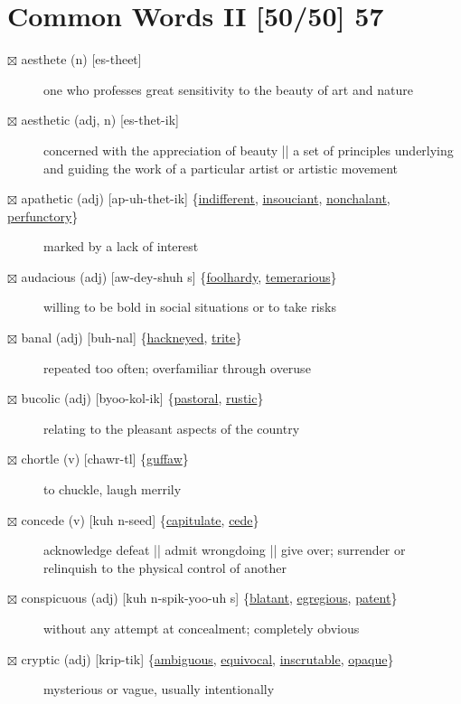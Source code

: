 \documentclass[11pt]{article}
\begin{document}
\section{Common Words II [50/50] 57}
\label{sec:org839aaba}
\begin{description}
\item[{$\boxtimes$ aesthete (n) [es-theet]}] one who professes great sensitivity to the beauty of art and nature
\item[{$\boxtimes$ aesthetic (adj, n) [es-thet-ik]}] concerned with the appreciation of beauty || a set of principles underlying and guiding the work of a particular artist or artistic movement
\item[{$\boxtimes$ \label{org934ecd1}apathetic (adj) [ap-uh-thet-ik] \{\hyperref[org1f21a65]{indifferent}, \hyperref[org2634905]{insouciant}, \hyperref[orge75040c]{nonchalant}, \hyperref[org8561795]{perfunctory}\}}] marked by a lack of interest
\item[{$\boxtimes$ \label{org075f98a}audacious (adj) [aw-dey-shuh s] \{\hyperref[org6f4610e]{foolhardy}, \hyperref[orgd7c2d20]{temerarious}\}}] willing to be bold in social situations or to take risks
\item[{$\boxtimes$ \label{orgf0ea999}banal (adj) [buh-nal] \{\hyperref[org3731f44]{hackneyed}, \hyperref[org91e02d4]{trite}\}}] repeated too often; overfamiliar through overuse
\item[{$\boxtimes$ \label{org534bd51}bucolic (adj) [byoo-kol-ik] \{\hyperref[orge85ac7b]{pastoral}, \hyperref[org9afee9b]{rustic}\}}] relating to the pleasant aspects of the country
\item[{$\boxtimes$ \label{org4d7ee4d}chortle (v) [chawr-tl] \{\hyperref[org9a6cddf]{guffaw}\}}] to chuckle, laugh merrily
\item[{$\boxtimes$ \label{orgb17c891}concede (v) [kuh n-seed] \{\hyperref[org17c47ed]{capitulate}, \hyperref[orgd728c67]{cede}\}}] acknowledge defeat || admit wrongdoing || give over; surrender or relinquish to the physical control of another
\item[{$\boxtimes$ \label{org6c56ea5}conspicuous (adj) [kuh n-spik-yoo-uh s] \{\hyperref[org1b61d78]{blatant}, \hyperref[org178f47e]{egregious}, \hyperref[org70fed6f]{patent}\}}] without any attempt at concealment; completely obvious
\item[{$\boxtimes$ \label{org55b5c86}cryptic (adj) [krip-tik] \{\hyperref[orgc4611e5]{ambiguous}, \hyperref[orgd229018]{equivocal}, \hyperref[org3d97e2d]{inscrutable}, \hyperref[org26d66c4]{opaque}\}}] mysterious or vague, usually intentionally

\end{description}
\end{document}
